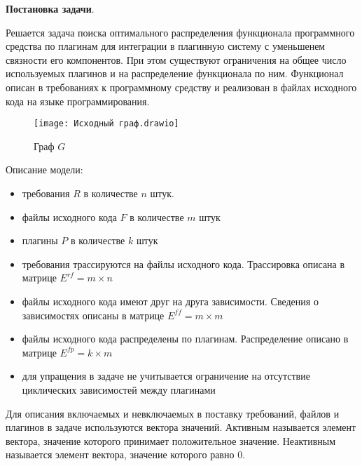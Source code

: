 \documentclass{article}
\begin{document}
  \textbf{Постановка задачи}.

  Решается задача поиска оптимального распределения функционала программного средства по плагинам для интеграции в плагинную систему с уменьшенем связности его компонентов. При этом существуют ограничения на общее число используемых плагинов и на распределение функционала по ним. Функционал описан в требованиях к программному средству и реализован в файлах исходного кода на языке программирования.

  \begin{figure}[H]
      \centering
      \texttt{[image: Исходный граф.drawio]}
      \caption{Граф $G$}
  \end{figure}

  Описание модели:
  \begin{itemize}
    \item требования $R$ в количестве $n$ штук.
    \item файлы исходного кода $F$ в количестве $m$ штук
    \item плагины $P$ в количестве $k$ штук
    \item требования трассируются на файлы исходного кода. Трассировка описана в матрице $E^{rf} = m \times n$
    \item файлы исходного кода имеют друг на друга зависимости. Сведения о зависимостях описаны в матрице $E^{ff} = m \times m$
    \item файлы исходного кода распределены по плагинам. Распределение описано в матрице $E^{fp} = k \times m$
    \item для упращения в задаче не учитывается ограничение на отсутствие циклических зависимостей между плагинами
  \end{itemize}

  Для описания включаемых и невключаемых в поставку требований, файлов и плагинов в задаче используются вектора значений. Активным называется элемент вектора, значение которого принимает положительное значение. Неактивным называется элемент вектора, значение которого равно $0$.
\end{document}

